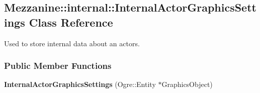 \hypertarget{classMezzanine_1_1internal_1_1InternalActorGraphicsSettings}{
\subsection{Mezzanine::internal::InternalActorGraphicsSettings Class Reference}
\label{classMezzanine_1_1internal_1_1InternalActorGraphicsSettings}
}


Used to store internal data about an actors.  


\subsubsection*{Public Member Functions}
\begin{DoxyCompactItemize}
\item 
\hypertarget{classMezzanine_1_1internal_1_1InternalActorGraphicsSettings_a2393337d400617fdc47782de6dc85277}{
{\bfseries InternalActorGraphicsSettings} (Ogre::Entity $\ast$GraphicsObject)}
\label{classMezzanine_1_1internal_1_1InternalActorGraphicsSettings_a2393337d400617fdc47782de6dc85277}

\end{DoxyCompactItemize}
